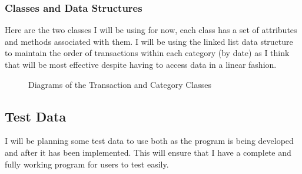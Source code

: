 \documentclass{article}
\begin{document}
\subsubsection{Classes and Data Structures}
Here are the two classes I will be using for now, each class has a set of attributes and methods associated with them. I will be using the linked list data structure to maintain the order of transactions within each category (by date) as I think that will be most effective despite having to access data in a linear fashion.
\begin{figure}[H]
    \centering
    
    \caption{Diagrams of the Transaction and Category Classes}
    \label{fig:ClassDiagram}
\end{figure}

\subsection{Test Data}
I will be planning some test data to use both as the program is being developed and after it has been implemented. This will ensure that I have a complete and fully working program for users to test easily.\newline
\end{document}
